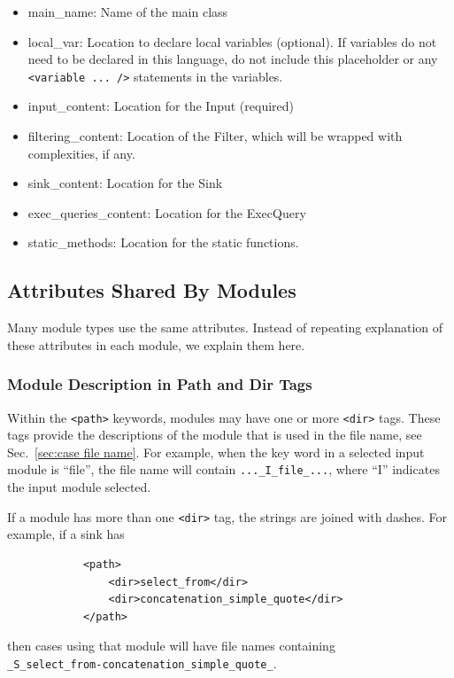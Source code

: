 \begin{itemize}
\begin{itemize}
        \item main\_name:  Name of the main class

        \item local\_var: Location to declare local variables (optional).  If
          variables do not need to be declared in this language, do not include this
          placeholder or any \verb|<variable ... />| statements in the variables.

        \item input\_content:  Location for the Input (required)

        \item filtering\_content: Location of the Filter, which will be wrapped with
          complexities, if any.

        \item sink\_content:  Location for the Sink

        \item exec\_queries\_content:  Location for the ExecQuery

        \item static\_methods:  Location for the static functions.
    \end{itemize}
\end{itemize}


\subsection{Attributes Shared By Modules}
\label{sec:shared attributes}

Many module types use the same attributes.  Instead of repeating explanation of
these attributes in each module, we explain them here.

\subsubsection{Module Description in Path and Dir Tags}
\label{sec:module description}

Within the \verb|<path>| keywords, modules may have one or more \verb|<dir>| tags.
These tags provide the descriptions of the module that is used in the file name, see
Sec.~\ref{sec:case file name}.  For example, when the key word in a selected input
module is ``file'', the file name will contain \verb|..._I_file_...|, where ``I''
indicates the input module selected.

If a module has more than one \verb|<dir>| tag, the strings are joined with dashes.
For example, if a sink has
\begin{verbatim}
            <path>
                <dir>select_from</dir>
                <dir>concatenation_simple_quote</dir>
            </path>
\end{verbatim}
then cases using that module will have file names containing \\
\verb|_S_select_from-concatenation_simple_quote_|.

